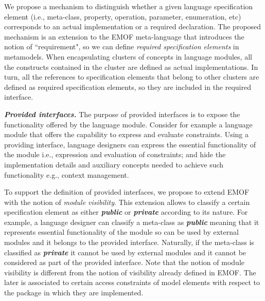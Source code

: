 We propose a mechanism to distinguish whether a given language specification element (i.e., meta-class, property, operation, parameter, enumeration, etc) corresponds to an actual implementation or a required declaration. The proposed mechanism is an extension to the EMOF meta-language that introduces the notion of ``requirement", so we can define \textit{required specification elements} in metamodels. When encapsulating clusters of concepts in language modules, all the constructs contained in the cluster are defined as actual implementations. In turn, all the references to specification elements that belong to other clusters are defined as required specification elements, so they are included in the required interface. 

%



\vspace{2mm}
\textit{\textbf{Provided interfaces.}} The purpose of provided interfaces is to expose the functionality offered by the language module. Consider for example a language module that offers the capability to express and evaluate constraints. Using a providing interface, language designers can express the essential functionality of the module i.e., expression and evaluation of constraints; and hide the implementation details and auxiliary concepts needed to achieve such functionality e.g., context management.

To support the definition of provided interfaces, we propose to extend EMOF with the notion of \textit{module visibility}. This extension allows to classify a certain specification element as either \textsl{\textbf{public}} or \textsl{\textbf{private}} according to its nature. For example, a language designer can classify a meta-class as \textsl{\textbf{public}} meaning that it represents essential functionality of the module so can be used by external modules and it belongs to the provided interface. Naturally, if the meta-class is classified as \textsl{\textbf{private}} it cannot be used by external modules and it cannot be considered as part of the provided interface. Note that the notion of module visibility is different from the notion of visibility already defined in EMOF. The later is associated to  certain access constraints of model elements with respect to the package in which they are implemented.

